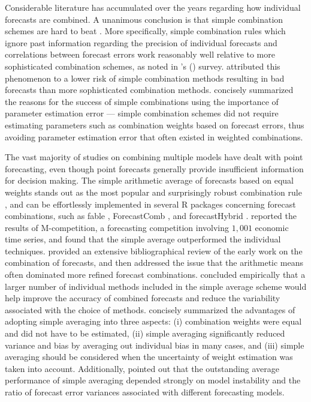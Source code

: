 \documentclass[11pt]{article}
\newcommand{\pkg}[1]{{\normalfont\fontseries{b}\selectfont #1}}
\let\proglang=\textsf
\def\citeapos#1{\citeauthor{#1}'s (\citeyear{#1})}
\begin{document}
Considerable literature has accumulated over the years regarding how individual forecasts are combined. A unanimous conclusion is that simple combination schemes are hard to beat \citep{Clemen1989-fb,Fischer1999-kz,Stock2004-rq,Lichtendahl2020-ut}. More specifically, simple combination rules which ignore past information regarding the precision of individual forecasts and correlations between forecast errors work reasonably well relative to more sophisticated combination schemes, as noted in \citeapos{Clemen1989-fb} survey. \cite{Lichtendahl2020-ut} attributed this phenomenon to a lower risk of simple combination methods resulting in bad forecasts than more sophisticated combination methods. \cite{Timmermann2006-en} concisely summarized the reasons for the success of simple combinations using the importance of parameter estimation error --- simple combination schemes did not require estimating parameters such as combination weights based on forecast errors, thus avoiding parameter estimation error that often existed in weighted combinations.

The vast majority of studies on combining multiple models have dealt with point forecasting, even though point forecasts generally provide insufficient information for decision making. The simple arithmetic average of forecasts based on equal weights stands out as the most popular and surprisingly robust combination rule \citep[see][]{Bunn1985-vo,Clemen1986-pd,Stock2003-sp,Genre2013-ut}, and can be effortlessly implemented in several \proglang{R} packages concerning forecast combinations, such as \pkg{fable} \citep{rfable}, \pkg{ForecastComb} \citep{rForecastComb}, and \pkg{forecastHybrid} \citep{rforecastHybrid}. \cite{Makridakis1982-hb} reported the results of M-competition, a forecasting competition involving $1,001$ economic time series, and found that the simple average outperformed the individual techniques. \cite{Clemen1989-fb} provided an extensive bibliographical review of the early work on the combination of forecasts, and then addressed the issue that the arithmetic means often dominated more refined forecast combinations. \cite{Makridakis1983-hg} concluded empirically that a larger number of individual methods included in the simple average scheme would help improve the accuracy of combined forecasts and reduce the variability associated with the choice of methods. \cite{Palm1992-im} concisely summarized the advantages of adopting simple averaging into three aspects: (i) combination weights were equal and did not have to be estimated, (ii) simple averaging significantly reduced variance and bias by averaging out individual bias in many cases, and (iii) simple averaging should be considered when the uncertainty of weight estimation was taken into account. Additionally, \cite{Timmermann2006-en} pointed out that the outstanding average performance of simple averaging depended strongly on model instability and the ratio of forecast error variances associated with different forecasting models.
\end{document}
